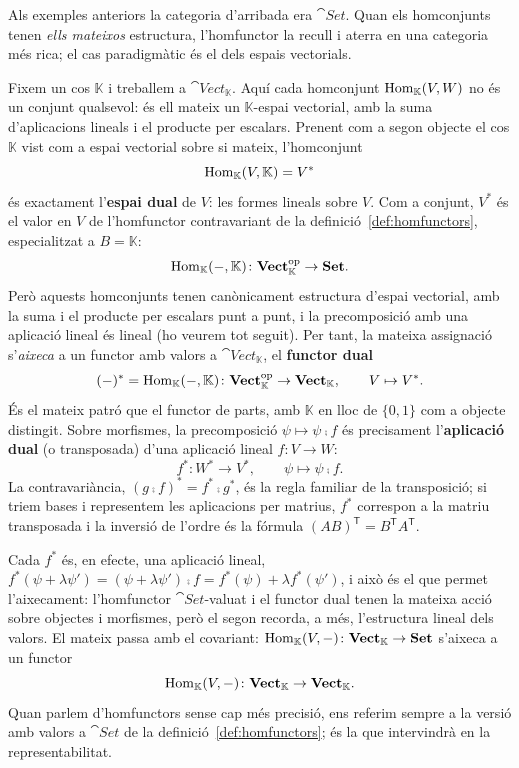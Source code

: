 Als exemples anteriors la categoria d'arribada era $\cat{Set}$. Quan els homconjunts tenen \emph{ells mateixos} estructura, l'homfunctor la recull i aterra en una categoria més rica; el cas paradigmàtic és el dels espais vectorials.

\begin{exemple}\label{ex:homfunctor-dual}
Fixem un cos $\mathbb K$ i treballem a $\cat{Vect}_{\mathbb K}$. Aquí cada homconjunt $\operatorname{Hom}_{\mathbb K}(V,W)$ no és un conjunt qualsevol: és ell mateix un $\mathbb K$-espai vectorial, amb la suma d'aplicacions lineals i el producte per escalars. Prenent com a segon objecte el cos $\mathbb K$ vist com a espai vectorial sobre si mateix, l'homconjunt
\[
\operatorname{Hom}_{\mathbb K}(V,\mathbb K)=V^*
\]
és exactament l'\textbf{espai dual} de $V$: les formes lineals sobre $V$. Com a conjunt, $V^*$ és el valor en $V$ de l'homfunctor contravariant de la definició~\ref{def:homfunctors}, especialitzat a $B=\mathbb K$:
\[
\operatorname{Hom}_{\mathbb K}(-,\mathbb K)\colon\mathbf{Vect}_{\mathbb K}^{\mathrm{op}}\to\mathbf{Set}.
\]
Però aquests homconjunts tenen canònicament estructura d'espai vectorial, amb la suma i el producte per escalars punt a punt, i la precomposició amb una aplicació lineal és lineal (ho veurem tot seguit). Per tant, la mateixa assignació s'\emph{aixeca} a un functor amb valors a $\cat{Vect}_{\mathbb K}$, el \textbf{functor dual}
\[
(-)^*=\operatorname{Hom}_{\mathbb K}(-,\mathbb K)\colon\mathbf{Vect}_{\mathbb K}^{\mathrm{op}}\to\mathbf{Vect}_{\mathbb K},
\qquad V\mapsto V^*.
\]
És el mateix patró que el functor de parts, amb $\mathbb K$ en lloc de $\{0,1\}$ com a objecte distingit. Sobre morfismes, la precomposició $\psi\mapsto\psi\comp f$ és precisament l'\textbf{aplicació dual} (o transposada) d'una aplicació lineal $f\colon V\to W$:
\[
f^*\colon W^*\to V^*,\qquad \psi\mapsto\psi\comp f.
\]
La contravariància, $(g\comp f)^*=f^*\comp g^*$, és la regla familiar de la transposició; si triem bases i representem les aplicacions per matrius, $f^*$ correspon a la matriu transposada i la inversió de l'ordre és la fórmula $(AB)^{\mathsf T}=B^{\mathsf T}A^{\mathsf T}$.

Cada $f^*$ és, en efecte, una aplicació lineal, $f^*(\psi+\lambda\psi')=(\psi+\lambda\psi')\comp f=f^*(\psi)+\lambda f^*(\psi')$, i això és el que permet l'aixecament: l'homfunctor $\cat{Set}$-valuat i el functor dual tenen la mateixa acció sobre objectes i morfismes, però el segon recorda, a més, l'estructura lineal dels valors. El mateix passa amb el covariant: $\operatorname{Hom}_{\mathbb K}(V,-)\colon\mathbf{Vect}_{\mathbb K}\to\mathbf{Set}$ s'aixeca a un functor
\[
\operatorname{Hom}_{\mathbb K}(V,-)\colon\mathbf{Vect}_{\mathbb K}\to\mathbf{Vect}_{\mathbb K}.
\]
Quan parlem d'homfunctors sense cap més precisió, ens referim sempre a la versió amb valors a $\cat{Set}$ de la definició~\ref{def:homfunctors}; és la que intervindrà en la representabilitat.


\end{exemple}
